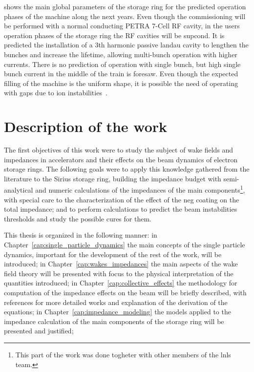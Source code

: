     shows the main global parameters of the storage ring for the predicted operation phases of the machine along the next years. Even though the commissioning will be performed with a normal conducting PETRA 7-Cell RF cavity, in the users operation phases of the storage ring the RF cavities will be \gls{supcond}. It is predicted the installation of a 3th harmonic passive landau cavity to lengthen the bunches and increase the lifetime, allowing multi-bunch operation with higher currents. There is no prediction of operation with single bunch, but high single bunch current in the middle of the train is foresaw. Even though the expected filling of the machine is the uniform shape, it is possible the need of operating with gaps due to ion instabilities~\cite{Wang2013a,Nagaoka2014}.

\section{Description of the work}

    The first objectives of this work were to study the subject of wake fields and impedances in accelerators and their effects on the beam dynamics of electron storage rings. The following goals were to apply this knowledge gathered from the literature to the Sirius storage ring, building the impedance budget with semi-analytical and numeric calculations of the impedances of the main components\footnote{This part of the work was done togheter with other members of the \gls{lnls} team.}, with special care to the characterization of the effect of the \gls{neg} coating on the total impedance; and to perform calculations to predict the beam instabilities thresholds and study the possible cures for them.

    This thesis is organized in the following manner: in Chapter~\ref{cap:single_particle_dynamics} the main concepts of the single particle dynamics, important for the development of the rest of the work, will be introduced; in Chapter~\ref{cap:wakes_impedances} the main aspects of the wake field theory will be presented with focus to the physical interpretation of the quantities introduced; in Chapter~\ref{cap:collective_effects} the methodology for computation of the impedance effects on the beam will be briefly described, with references for more detailed works and explanation of the derivation of the equations; in Chapter~\ref{cap:impedance_modeling} the models applied to the impedance calculation of the main components of the storage ring will be presented and justified;


